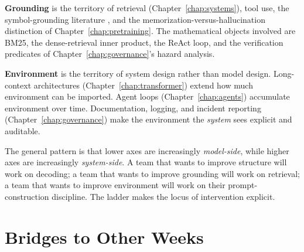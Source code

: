 \textbf{Grounding} is the territory of retrieval (Chapter~\ref{chap:systems}), tool
use, the symbol-grounding literature \citep{harnad1990symbol,
bender2020climbing}, and the memorization-versus-hallucination
distinction of Chapter~\ref{chap:pretraining}. The mathematical objects involved are
BM25, the dense-retrieval inner product, the ReAct loop, and the
verification predicates of Chapter~\ref{chap:governance}'s hazard analysis.

\textbf{Environment} is the territory of system design rather than
model design. Long-context architectures (Chapter~\ref{chap:transformer}) extend how
much environment can be imported. Agent loops (Chapter~\ref{chap:agents})
accumulate environment over time. Documentation, logging, and
incident reporting (Chapter~\ref{chap:governance}) make the environment the
\emph{system} sees explicit and auditable.

The general pattern is that lower axes are increasingly
\emph{model-side}, while higher axes are increasingly
\emph{system-side}. A team that wants to improve structure will
work on decoding; a team that wants to improve grounding will
work on retrieval; a team that wants to improve environment will
work on their prompt-construction discipline. The ladder makes the
locus of intervention explicit.

\section{Bridges to Other Weeks}

